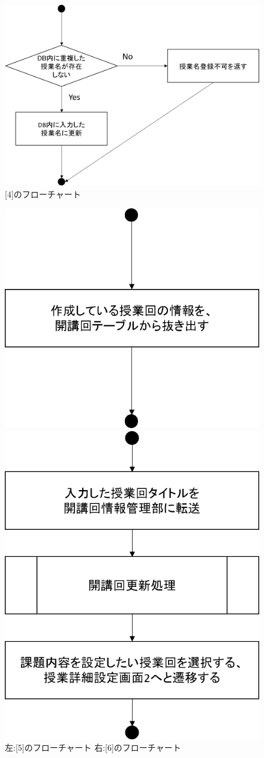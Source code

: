 \begin{figure}[htbp]
  \begin{center}
    \includegraphics[width=0.5\linewidth,clip]{./img/takeover_lecture/sub4.png}
    \caption{[4]のフローチャート}\label{fig:takeoverflow1.2}
  \end{center}
\end{figure}



\begin{figure}[htbp]
 \begin{minipage}{0.5\hsize}
  \begin{center}
   \includegraphics[width=0.45\linewidth,clip]{./img/takeover_lecture/sub5.png}
  \end{center}
 \end{minipage}
 \begin{minipage}{0.5\hsize}
  \begin{center}
   \includegraphics[width=0.45\linewidth,clip]{./img/takeover_lecture/sub6.png}
  \end{center}
 \end{minipage}
 \caption{左:[5]のフローチャート 右:[6]のフローチャート}\label{fig:takeoverlectureflow2}
\end{figure}

